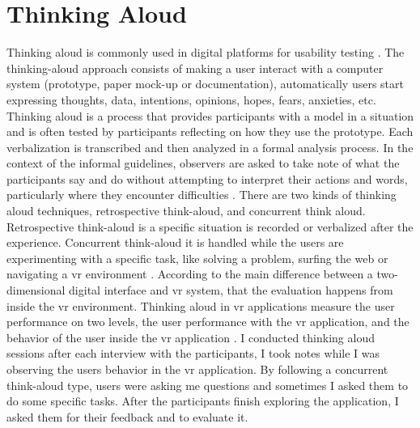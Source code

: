 \section{Thinking Aloud}

Thinking aloud is commonly used in digital platforms for usability testing \citep{VanWaes2000}. The thinking-aloud approach consists of making a user interact with a computer system (prototype, paper mock-up or documentation),  automatically users start expressing thoughts, data, intentions, opinions, hopes, fears, anxieties, etc.  Thinking aloud is a process that provides participants with a model in a situation and is often tested by participants reflecting on how they use the prototype. Each verbalization is transcribed and then analyzed in a formal analysis process. In the context of the informal guidelines, observers are asked to take note of what the participants say and do without attempting to interpret their actions and words, particularly where they encounter difficulties \citep{Jrgensen1990}. There are two kinds of thinking aloud techniques, retrospective think-aloud, and concurrent think aloud. Retrospective think-aloud is a specific situation is recorded or verbalized after the experience. Concurrent think-aloud it is handled while the users are experimenting with a specific task, like solving a problem, surfing the web or navigating a \acrshort{vr} environment \citep{Friedman2004NavigatingSteps}. According to \cite{Marsh1999EvaluationUsability} the main difference between a two-dimensional digital interface and \acrfull{vr} system, that the evaluation happens from inside the \acrshort{vr} environment. Thinking aloud in \acrshort{vr} applications measure the user performance on two levels, the user performance with the \acrshort{vr} application, and the behavior of the user inside the \acrshort{vr} application \citep{Marsh1999EvaluationUsability}. I conducted thinking aloud sessions after each interview with the participants, I
took notes while I was observing the users behavior in the \acrshort{vr} application. By following
a concurrent think-aloud type, users were asking me questions and sometimes I asked
them to do some specific tasks. After the participants finish exploring the application, I asked them for their feedback and to evaluate it.  





